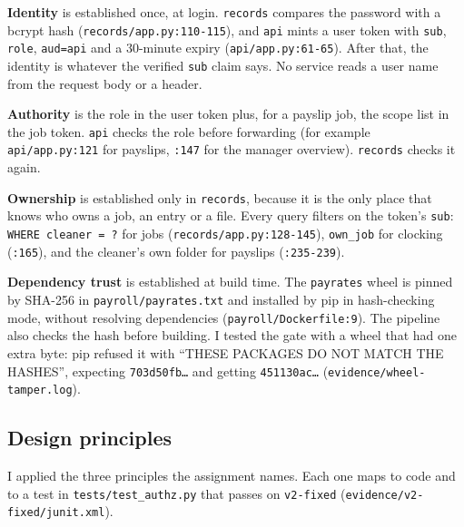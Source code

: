 \documentclass[11pt,a4paper]{article}
\newcommand{\file}[1]{\nolinkurl{#1}}
\begin{document}
\textbf{Identity} is established once, at login. \texttt{records} compares the password with a bcrypt hash (\file{records/app.py:110-115}), and \texttt{api} mints a user token with \texttt{sub}, \texttt{role}, \texttt{aud=api} and a 30-minute expiry (\file{api/app.py:61-65}). After that, the identity is whatever the verified \texttt{sub} claim says. No service reads a user name from the request body or a header.

\textbf{Authority} is the role in the user token plus, for a payslip job, the scope list in the job token. \texttt{api} checks the role before forwarding (for example \file{api/app.py:121} for payslips, \file{:147} for the manager overview). \texttt{records} checks it again.

\textbf{Ownership} is established only in \texttt{records}, because it is the only place that knows who owns a job, an entry or a file. Every query filters on the token's \texttt{sub}: \texttt{WHERE cleaner = ?} for jobs (\file{records/app.py:128-145}), \texttt{own\_job} for clocking (\file{:165}), and the cleaner's own folder for payslips (\file{:235-239}).

\textbf{Dependency trust} is established at build time. The \texttt{payrates} wheel is pinned by SHA-256 in \file{payroll/payrates.txt} and installed by pip in hash-checking mode, without resolving dependencies (\file{payroll/Dockerfile:9}). The pipeline also checks the hash before building. I tested the gate with a wheel that had one extra byte: pip refused it with ``THESE PACKAGES DO NOT MATCH THE HASHES'', expecting \texttt{703d50fb\ldots} and getting \texttt{451130ac\ldots} (\file{evidence/wheel-tamper.log}).

\subsection*{Design principles}

I applied the three principles the assignment names. Each one maps to code and to a test in \file{tests/test_authz.py} that passes on \texttt{v2-fixed} (\file{evidence/v2-fixed/junit.xml}).
\end{document}
